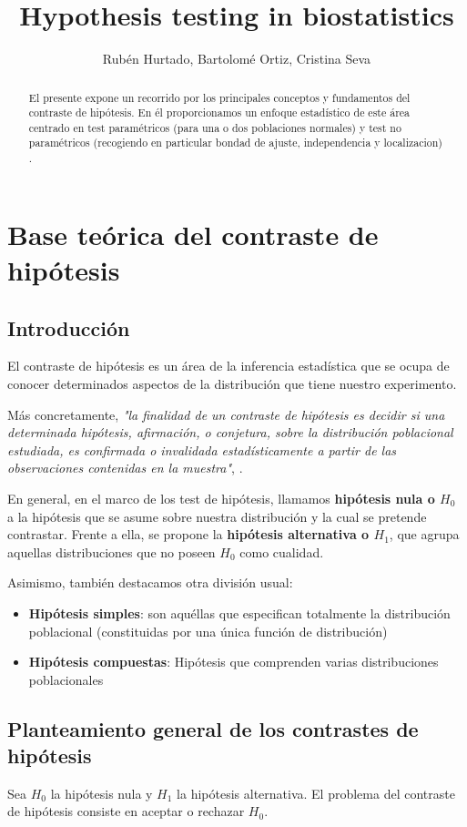 \documentclass[a4paper,12pt]{article}
\title{Hypothesis testing in biostatistics}
\author{Rubén Hurtado, Bartolomé Ortiz, Cristina Seva }
\begin{document}
\maketitle

\begin{abstract}
El presente expone un recorrido por los principales conceptos y fundamentos del contraste de hipótesis. En él proporcionamos un enfoque estadístico de este área centrado en test paramétricos (para una o dos poblaciones normales) y test no paramétricos (recogiendo en particular bondad de ajuste, independencia y localizacion) . 
\end{abstract}


\section{Base teórica del contraste de hipótesis}
\subsection{Introducción}
El contraste de hipótesis es un área de la inferencia estadística que se ocupa de conocer determinados aspectos de la distribución que tiene nuestro experimento.

Más concretamente, \textit{"la finalidad de un contraste de hipótesis es decidir si una determinada hipótesis, afirmación, o conjetura, sobre la distribución poblacional estudiada, es confirmada o invalidada estadísticamente a partir de las observaciones contenidas en la muestra"}, \cite{velez1993principios}.

En general, en el marco de los test de hipótesis, llamamos \textbf{hipótesis nula o $H_0$} a la hipótesis que se asume sobre nuestra distribución y la cual se pretende contrastar.
Frente a ella, se propone la \textbf{hipótesis alternativa o $H_1$}, que agrupa aquellas distribuciones que no poseen $H_0$ como cualidad.

Asimismo, también destacamos otra división usual:
\begin{itemize}
	\item \textbf{Hipótesis simples}: son aquéllas que especifican totalmente la distribución poblacional (constituidas por una única función de distribución)
	\item \textbf{Hipótesis compuestas}: Hipótesis  que comprenden varias distribuciones poblacionales 
\end{itemize}

\subsection{Planteamiento general de los contrastes de hipótesis}
Sea $H_0$ la hipótesis nula y $H_1$ la hipótesis alternativa. El problema del contraste de hipótesis consiste en aceptar o rechazar $H_0$.
\end{document}

